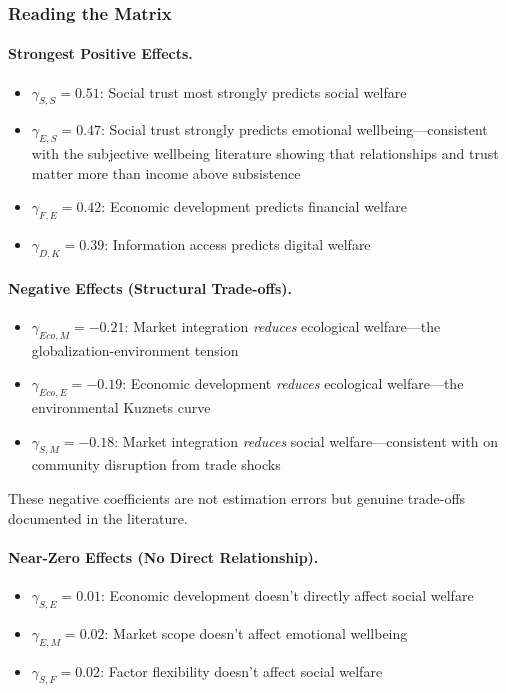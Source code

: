 \subsubsection{Reading the Matrix}

\paragraph{Strongest Positive Effects.}
\begin{itemize}
  \item $\gamma_{S,S} = 0.51$: Social trust most strongly predicts social welfare
  \item $\gamma_{E,S} = 0.47$: Social trust strongly predicts emotional wellbeing---consistent with the subjective wellbeing literature showing that relationships and trust matter more than income above subsistence \citep{helliwell2004social}
  \item $\gamma_{F,E} = 0.42$: Economic development predicts financial welfare
  \item $\gamma_{D,K} = 0.39$: Information access predicts digital welfare
\end{itemize}

\paragraph{Negative Effects (Structural Trade-offs).}
\begin{itemize}
  \item $\gamma_{Eco,M} = -0.21$: Market integration \emph{reduces} ecological welfare---the globalization-environment tension
  \item $\gamma_{Eco,E} = -0.19$: Economic development \emph{reduces} ecological welfare---the environmental Kuznets curve
  \item $\gamma_{S,M} = -0.18$: Market integration \emph{reduces} social welfare---consistent with \citet{autor2013china} on community disruption from trade shocks
\end{itemize}

These negative coefficients are not estimation errors but genuine trade-offs documented in the literature.

\paragraph{Near-Zero Effects (No Direct Relationship).}
\begin{itemize}
  \item $\gamma_{S,E} = 0.01$: Economic development doesn't directly affect social welfare
  \item $\gamma_{E,M} = 0.02$: Market scope doesn't affect emotional wellbeing
  \item $\gamma_{S,F} = 0.02$: Factor flexibility doesn't affect social welfare
\end{itemize}

